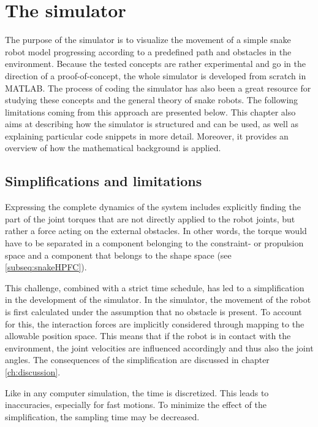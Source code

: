 \chapter{The simulator}\label{ch:simulator}

The purpose of the simulator is to visualize the movement of a simple snake robot model progressing according to a predefined path and obstacles in the environment. Because the tested concepts are rather experimental and go in the direction of a proof-of-concept, the whole simulator is developed from scratch in MATLAB. The process of coding the simulator has also been a great resource for studying these concepts and the general theory of snake robots. The following limitations coming from this approach are presented below.
This chapter also aims at describing how the simulator is structured and can be used, as well as explaining particular code snippets in more detail. Moreover, it provides an overview of how the mathematical background is applied.


\section{Simplifications and limitations}

Expressing the complete dynamics of the system includes explicitly finding the part of the joint torques that are not directly applied to the robot joints, but rather a force acting on the external obstacles. In other words, the torque would have to be separated in a component belonging to the constraint- or propulsion space and a component that belongs to the shape space (see \ref{subseq:snakeHPFC}).

This challenge, combined with a strict time schedule, has led to a simplification in the development of the simulator. In the simulator, the movement of the robot is first calculated under the assumption that no obstacle is present. To account for this, the interaction forces are implicitly considered through mapping to the allowable position space. This means that if the robot is in contact with the environment, the joint velocities are influenced accordingly and thus also the joint angles. The consequences of the simplification are discussed in chapter \ref{ch:discussion}.

Like in any computer simulation, the time is discretized. This leads to inaccuracies, especially for fast motions. To minimize the effect of the simplification, the sampling time may be decreased. 

